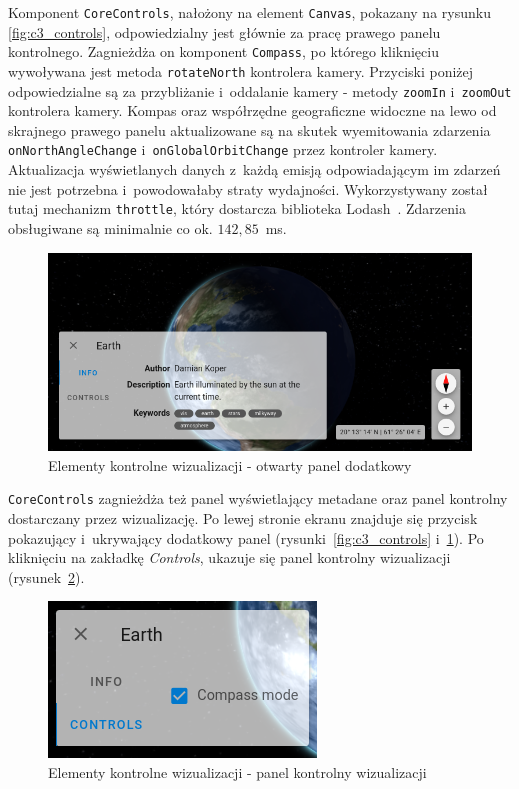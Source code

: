 Komponent \texttt{CoreControls}, nałożony na element \texttt{Canvas}, pokazany na rysunku \ref{fig:c3_controls}, odpowiedzialny jest głównie za pracę prawego panelu kontrolnego. Zagnieżdża on komponent \texttt{Compass}, po którego kliknięciu wywoływana jest metoda \texttt{rotateNorth} kontrolera kamery. Przyciski poniżej odpowiedzialne są za przybliżanie i~oddalanie kamery - metody \texttt{zoomIn} i~\texttt{zoomOut} kontrolera kamery. Kompas oraz współrzędne geograficzne widoczne na lewo od skrajnego prawego panelu aktualizowane są na skutek wyemitowania zdarzenia \texttt{onNorthAngleChange} i~\texttt{onGlobalOrbitChange} przez kontroler kamery. Aktualizacja wyświetlanych danych z~każdą emisją odpowiadającym im zdarzeń nie jest potrzebna i~powodowałaby straty wydajności. Wykorzystywany został tutaj mechanizm \texttt{throttle}, który dostarcza biblioteka Lodash~\cite{lodash}. Zdarzenia obsługiwane są minimalnie co ok. $142,85$~ms.
\begin{figure}
    \centering
    \includegraphics[width=\linewidth]{img/c3_controls_open.png}
    \caption{Elementy kontrolne wizualizacji - otwarty panel dodatkowy}
    \label{fig:c3_controls_open}
\end{figure}


\begin{samepage}
\texttt{CoreControls} zagnieżdża też panel wyświetlający metadane oraz panel kontrolny dostarczany przez wizualizację. Po lewej stronie ekranu znajduje się przycisk pokazujący i~ukrywający dodatkowy panel (rysunki~\ref{fig:c3_controls} i~\ref{fig:c3_controls_open}). Po kliknięciu na zakładkę \textit{Controls}, ukazuje się panel kontrolny wizualizacji (rysunek~\ref{fig:c3_controls_earth}).
\end{samepage}

\begin{figure}
    \centering
    \includegraphics[scale=2.1]{img/c3_controls_earth.png}
    \caption{Elementy kontrolne wizualizacji - panel kontrolny wizualizacji}
    \label{fig:c3_controls_earth} 
\end{figure}

